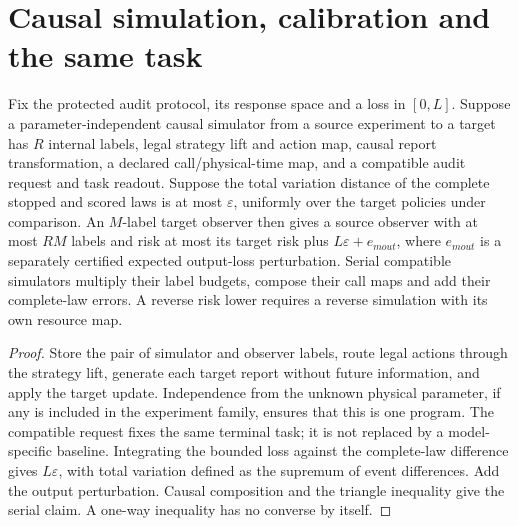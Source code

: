 \section{Causal simulation, calibration and the same task}\label{sec:composition}
\begin{proposition}\label{prop:morphism}
Fix the protected audit protocol, its response space and a loss in $[0,L]$. Suppose a parameter-independent causal simulator from a source experiment to a target has $R$ internal labels, legal strategy lift and action map, causal report transformation, a declared call/physical-time map, and a compatible audit request and task readout. Suppose the total variation distance of the complete stopped and scored laws is at most $\varepsilon$, uniformly over the target policies under comparison. An $M$-label target observer then gives a source observer with at most $RM$ labels and risk at most its target risk plus $L\varepsilon+e_{
m out}$, where $e_{
m out}$ is a separately certified expected output-loss perturbation. Serial compatible simulators multiply their label budgets, compose their call maps and add their complete-law errors. A reverse risk lower requires a reverse simulation with its own resource map.
\end{proposition}
\begin{proof}
Store the pair of simulator and observer labels, route legal actions through the strategy lift, generate each target report without future information, and apply the target update. Independence from the unknown physical parameter, if any is included in the experiment family, ensures that this is one program. The compatible request fixes the same terminal task; it is not replaced by a model-specific baseline. Integrating the bounded loss against the complete-law difference gives $L\varepsilon$, with total variation defined as the supremum of event differences. Add the output perturbation. Causal composition and the triangle inequality give the serial claim. A one-way inequality has no converse by itself.
\end{proof}

